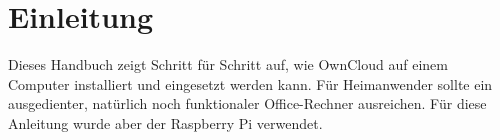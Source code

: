 \section{Einleitung}
Dieses Handbuch zeigt Schritt für Schritt auf, wie OwnCloud auf einem Computer installiert und eingesetzt werden kann. Für Heimanwender sollte ein ausgedienter, natürlich noch funktionaler Office-Rechner ausreichen. Für diese Anleitung wurde aber der Raspberry Pi verwendet.


